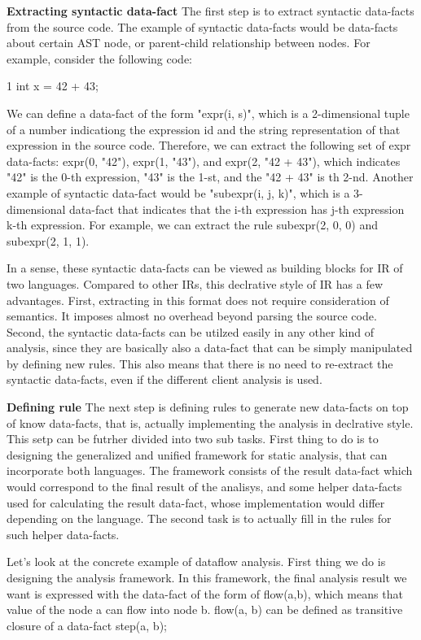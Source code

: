 \textbf{Extracting syntactic data-fact}
The first step is to extract syntactic data-facts from the source code.
The example of syntactic data-facts would be data-facts about certain
AST node, or parent-child relationship between nodes. For example, consider
the following code:

1 int x = 42 + 43;

We can define a data-fact of the form "expr(i, s)", which is a 2-dimensional
tuple of a number indicationg the expression id and the string representation
of that expression in the source code.  Therefore, we can extract the following
set of expr data-facts: expr(0, "42"), expr(1, "43"), and expr(2, "42 + 43"),
which indicates "42" is the 0-th expression, "43" is the 1-st, and the "42 +
43" is th 2-nd.  Another example of syntactic data-fact would be "subexpr(i, j,
k)", which is a 3-dimensional data-fact that indicates that the i-th expression
has j-th expression k-th expression. For example, we can extract the rule
subexpr(2, 0, 0) and subexpr(2, 1, 1).

In a sense, these syntactic data-facts can be viewed as building blocks for IR
of two languages.  Compared to other IRs, this declrative style of IR has a few
advantages. First, extracting in this format does not require consideration of
semantics.  It imposes almost no overhead beyond parsing the source code.
Second, the syntactic data-facts can be utilzed easily in any other kind of
analysis, since they are basically also a data-fact that can be simply
manipulated by defining new rules.  This also means that there is no need to
re-extract the syntactic data-facts, even if the different client analysis is
used.

\textbf{Defining rule}
The next step is defining rules to generate new data-facts on top of know
data-facts, that is, actually implementing the analysis in declrative style.
This setp can be futrher divided into two sub tasks. First thing to do is to
designing the generalized and unified framework for static analysis, that can
incorporate both languages. The framework consists of the result data-fact which
would correspond to the final result of the analisys, and some helper
data-facts used for calculating the result data-fact, whose implementation
would differ depending on the language. The second task is to actually fill in
the rules for such helper data-facts.

Let's look at the concrete example of dataflow analysis. First thing we do is
designing the analysis framework.  In this framework, the final analysis result
we want is expressed with the data-fact of the form of flow(a,b), which means
that value of the node a can flow into node b. flow(a, b) can be defined as
transitive closure of a data-fact step(a, b);

